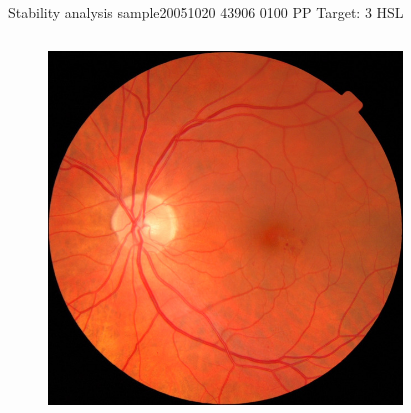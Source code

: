 \documentclass{beamer}
\begin{document}
\begin{frame}{Stability analysis sample}{20051020 43906 0100 PP Target: 3 HSL}
\begin{columns}
\begin{column}{0.3\textwidth}
\begin{figure}[p]
\centering
\includegraphics[width=\textwidth]{chapter_stability/20051020_43906_0100_PP/20051020_43906_0100_PP.jpeg}
\end{figure}	
\end{column}
\begin{column}{0.45\textwidth}  %
\begin{figure}[p]
\centering

\end{figure}
\end{column}
\end{columns}
\end{frame}
\end{document}
